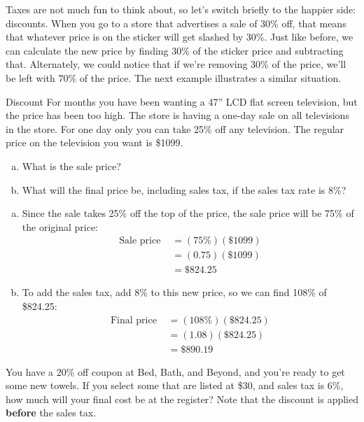 Taxes are not much fun to think about, so let's switch briefly to the happier side: discounts.  When you go to a store that advertises a sale of 30\% off, that means that whatever price is on the sticker will get slashed by 30\%.  Just like before, we can calculate the new price by finding 30\% of the sticker price and subtracting that.  Alternately, we could notice that if we're removing 30\% of the price, we'll be left with 70\% of the price.  The next example illustrates a similar situation.
\vfill
\text{}
\pagebreak

\begin{example}[https://www.youtube.com/watch?v=7s1dyRcaykU&list=PLfmpjsIzhztsZtnb7HnXrQ8SLoiOCIcAM&index=7]{Discount}
\marginnote{\texttt{[image: TV1]}}
For months you have been wanting a 47'' LCD flat screen television, but the price has been too high. The store is having a one-day sale on all televisions in the store. For one day only you can take 25\% off any television. The regular price on the television
you want is \$1099.
\begin{enumerate}[(a)]
\item What is the sale price?
\item What will the final price be, including sales tax, if the sales tax rate is 8\%?
\end{enumerate}

\solline
\begin{enumerate}[(a)]
\item Since the sale takes 25\% off the top of the price, the sale price will be 75\% of the original price:
\begin{align*}
\textrm{Sale price } &= (75\%)(\$1099)\\
&= (0.75)(\$1099)\\
&= \boxed{\$824.25}
\end{align*}

\item To add the sales tax, add 8\% to this new price, so we can find 108\% of \$824.25:
\begin{align*}
\textrm{Final price } &= (108\%)(\$824.25)\\
&= (1.08)(\$824.25)\\
&= \boxed{\$890.19}
\end{align*}
\end{enumerate}
\end{example}

\begin{try}
You have a 20\% off coupon at Bed, Bath, and Beyond, and you're ready to get some new towels.  If you select some that are listed at \$30, and sales tax is 6\%, how much will your final cost be at the register?  Note that the discount is applied \textbf{before} the sales tax.
\end{try}


